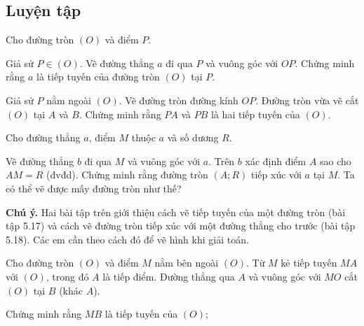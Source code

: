 \begin{practice}
    \subsection{Luyện tập}

    \begin{questions}[resume=SBT]
        \item Cho đường tròn $(O)$ và điểm $P$.
        \begin{questions}
            \item Giả sử $P\in(O)$. Vẽ đường thẳng $a$ đi qua $P$ và vuông góc với $OP$. Chứng minh rằng $a$ là tiếp tuyến của đường tròn $(O)$ tại $P$.

            \answerline
            \answerline

            \item Giả sử $P$ nằm ngoài $(O)$. Vẽ đường tròn đường kính $OP$. Đường tròn vừa vẽ cắt $(O)$ tại $A$ và $B$. Chứng minh rằng $PA$ và $PB$ là hai tiếp tuyến của $(O)$.

            \answerline
            \answerline
            \answerline
        \end{questions}

        \item Cho đường thẳng $a$, điểm $M$ thuộc $a$ và số dương $R$.

        Vẽ đường thẳng $b$ đi qua $M$ và vuông góc với $a$. Trên $b$ xác định điểm $A$ sao cho $AM=R$ (đvđd). Chứng minh rằng đường tròn $(A;R)$ tiếp xúc với $a$ tại $M$. Ta có thể vẽ được mấy đường tròn như thế?

        \answerline
        \answerline
        \answerline

        \textbf{Chú ý.} Hai bài tập trên giới thiệu cách vẽ tiếp tuyến của một đường tròn (bài tập 5.17) và cách vẽ đường tròn tiếp xúc với một đường thẳng cho trước (bài tập 5.18). Các em cần theo cách đó để vẽ hình khi giải toán.

        \item Cho đường tròn $(O)$ và điểm $M$ nằm bên ngoài $(O)$. Từ $M$ kẻ tiếp tuyến $MA$ với $(O)$, trong đó $A$ là tiếp điểm. Đường thẳng qua $A$ và vuông góc với $MO$ cắt $(O)$ tại $B$ (khác $A$).
        \begin{questions}
            \item Chứng minh rằng $MB$ là tiếp tuyến của $(O)$;

            \answerline
            \answerline
            \answerline


\end{questions}
\end{questions}
\end{practice}
